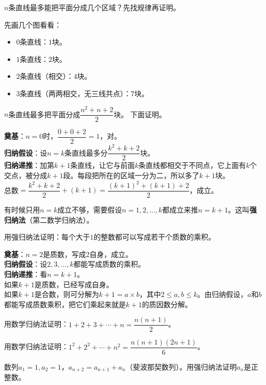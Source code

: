 \begin{example}
$n$条直线最多能把平面分成几个区域？先找规律再证明。
\end{example}
\begin{solution}
先画几个图看看：
\begin{itemize}
\item $0$条直线：$1$块。
\item $1$条直线：$2$块。
\item $2$条直线（相交）：$4$块。
\item $3$条直线（两两相交，无三线共点）：$7$块。
\end{itemize}
$n$条直线最多把平面分成$\dfrac{n^2+n+2}{2}$块。
下面证明。

\textbf{奠基}：$n=0$时，$\dfrac{0+0+2}{2}=1$，对。\\
\textbf{归纳假设}：设$n=k$条直线最多分$\dfrac{k^2+k+2}{2}$块。\\
\textbf{归纳递推}：加第$k+1$条直线，让它与前面$k$条直线都相交于不同点，它上面有$k$个交点，被分成$k+1$段。每段把所在的区域一分为二，所以多了$k+1$块。\\
总数$=\dfrac{k^2+k+2}{2}+(k+1)=\dfrac{(k+1)^2+(k+1)+2}{2}$，成立。
\end{solution}

有时候只用$n=k$成立不够，需要假设$n=1,2,\dots,k$都成立来推$n=k+1$。这叫\textbf{强归纳法}（第二数学归纳法）。

\begin{example}
用强归纳法证明：每个大于$1$的整数都可以写成若干个质数的乘积。
\end{example}
\begin{solution}
\textbf{奠基}：$n=2$是质数，写成$2$自身，成立。\\
\textbf{归纳假设}：设$2,3,\dots,k$都能写成质数的乘积。\\
\textbf{归纳递推}：看$n=k+1$。\\
如果$k+1$是质数，已经写成自身。\\
如果$k+1$是合数，则可分解为$k+1=a\times b$，其中$2\le a,b\le k$。由归纳假设，$a$和$b$都能写成质数乘积，把它们乘起来就是$k+1$的质因数分解。
\end{solution}

\begin{exercise}
\item 用数学归纳法证明：$1+2+3+\cdots+n=\dfrac{n(n+1)}{2}$。
\item 用数学归纳法证明：$1^2+2^2+\cdots+n^2=\dfrac{n(n+1)(2n+1)}{6}$。
\item 数列$a_1=1,a_2=1$，$a_{n+2}=a_{n+1}+a_n$（斐波那契数列）。用强归纳法证明$a_n$是正整数。
\end{exercise}

